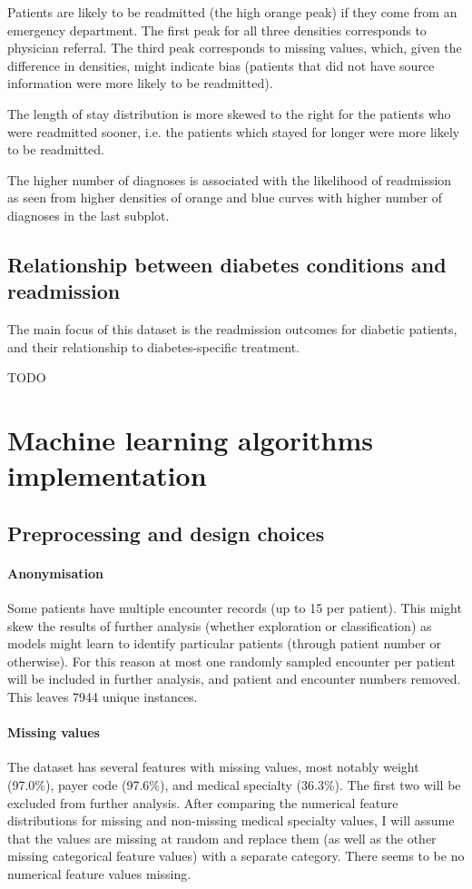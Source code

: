 \documentclass[10pt, twocolumn]{article}
\begin{document}
Patients are likely to be readmitted (the high orange peak) if they come from an emergency department. The first peak for all three densities corresponds to physician referral. The third peak corresponds to missing values, which, given the difference in densities, might indicate bias (patients that did not have source information were more likely to be readmitted).

The length of stay distribution is more skewed to the right for the patients who were readmitted sooner, i.e. the patients which stayed for longer were more likely to be readmitted.

The higher number of diagnoses is associated with the likelihood of readmission as seen from higher densities of orange and blue curves with higher number of diagnoses in the last subplot.


\subsection{Relationship between diabetes conditions and readmission}
The main focus of this dataset is the readmission outcomes for diabetic patients, and their relationship to diabetes-specific treatment.

\LARGE{TODO}

\normalsize

\section{Machine learning algorithms implementation}

\subsection{Preprocessing and design choices}

\paragraph{Anonymisation} Some patients have multiple encounter records (up to 15 per patient). This might skew the results of further analysis (whether exploration or classification) as models might learn to identify particular patients (through patient number or otherwise). For this reason at most one randomly sampled encounter per patient will be included in further analysis, and patient and encounter numbers removed. This leaves 7944 unique instances.

\paragraph{Missing values} The dataset has several features with missing values, most notably weight (97.0\%), payer code (97.6\%), and medical specialty (36.3\%). The first two will be excluded from further analysis. After comparing the numerical feature distributions for missing and non-missing medical specialty values, I will assume that the values are missing at random and replace them (as well as the other missing categorical feature values) with a separate category. There seems to be no numerical feature values missing.
\end{document}
